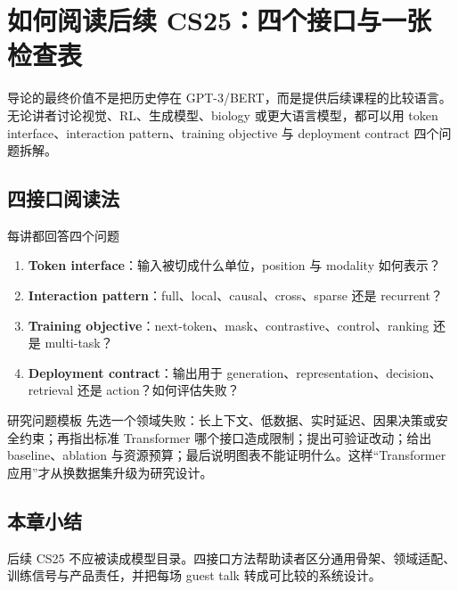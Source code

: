 \section{如何阅读后续 CS25：四个接口与一张检查表}

导论的最终价值不是把历史停在 GPT-3/BERT，而是提供后续课程的比较语言。无论讲者讨论视觉、RL、生成模型、biology 或更大语言模型，都可以用 token interface、interaction pattern、training objective 与 deployment contract 四个问题拆解。

\subsection{四接口阅读法}

\begin{importantbox}{每讲都回答四个问题}
\begin{enumerate}
  \item \textbf{Token interface}：输入被切成什么单位，position 与 modality 如何表示？
  \item \textbf{Interaction pattern}：full、local、causal、cross、sparse 还是 recurrent？
  \item \textbf{Training objective}：next-token、mask、contrastive、control、ranking 还是 multi-task？
  \item \textbf{Deployment contract}：输出用于 generation、representation、decision、retrieval 还是 action？如何评估失败？
\end{enumerate}
\end{importantbox}


\begin{knowledgebox}{研究问题模板}
先选一个领域失败：长上下文、低数据、实时延迟、因果决策或安全约束；再指出标准 Transformer 哪个接口造成限制；提出可验证改动；给出 baseline、ablation 与资源预算；最后说明图表不能证明什么。这样“Transformer 应用”才从换数据集升级为研究设计。
\end{knowledgebox}

\subsection{本章小结}

后续 CS25 不应被读成模型目录。四接口方法帮助读者区分通用骨架、领域适配、训练信号与产品责任，并把每场 guest talk 转成可比较的系统设计。

